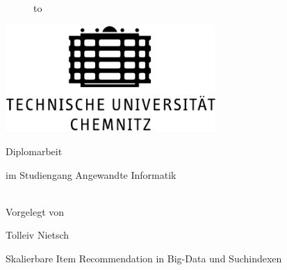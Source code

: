\begin{titlepage}
\begin{figure}
  \begin{center}
    \hbox to 
  \end{center}
\end{figure}

\begin{center}
\rule{0pt}{0pt}
\vfill
\vfill
\includegraphics[width=8cm]{Abbildungen/TUC_deutsch_SW.pdf}
\vfill
\vfill
\vfill
\vfill

\begin{Huge}
Diplomarbeit \\
\end{Huge}
im Studiengang Angewandte Informatik \\
~\\
\begin{footnotesize}
Vorgelegt von \\
\end{footnotesize}
\begin{large}
Tolleiv Nietsch \\
\end{large}
\begin{footnotesize}
\end{footnotesize}

\vfill
\vfill

\begin{large}Skalierbare Item Recommendation in Big-Data und Suchindexen\end{large} \\


\vfill

\end{center}
\end{titlepage}

